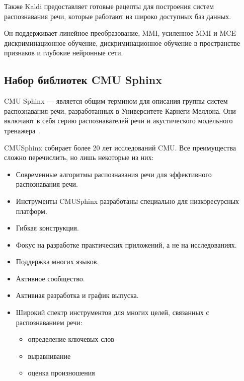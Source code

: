 Также Kaldi предоставляет готовые рецепты для построения систем \\
\mbox{распознавания} речи, которые работают из широко доступных баз данных.

Он поддерживает линейное преобразование, MMI,
усиленное MMI и MCE дискриминационное обучение, дискриминационное обучение в
пространстве признаков и глубокие нейронные сети.

\subsection{Набор библиотек CMU Sphinx}
CMU Sphinx --- является общим термином для описания группы систем распознавания
речи, разработанных в Университете Карнеги-Меллона. Они включают в себя серию
распознавателей речи и акустического модельного тренажера~\cite{sphinx}.

CMUSphinx собирает более 20 лет исследований CMU. Все преимущества сложно перечислить,
но лишь некоторые из них:
\begin{itemize}
    \item Современные алгоритмы распознавания речи для эффективного распознавания речи.
    \item Инструменты CMUSphinx разработаны специально для низкоресурсных платформ.
    \item Гибкая конструкция.
    \item Фокус на разработке практических приложений, а не на исследованиях.
    \item Поддержка многих языков.
    \item Активное сообщество.
    \item Активная разработка и график выпуска.
    \item Широкий спектр инструментов для многих целей, связанных с распознаванием речи:
    \begin{itemize}
        \item определение ключевых слов
        \item выравнивание
        \item оценка произношения
    \end{itemize}
\end{itemize}

